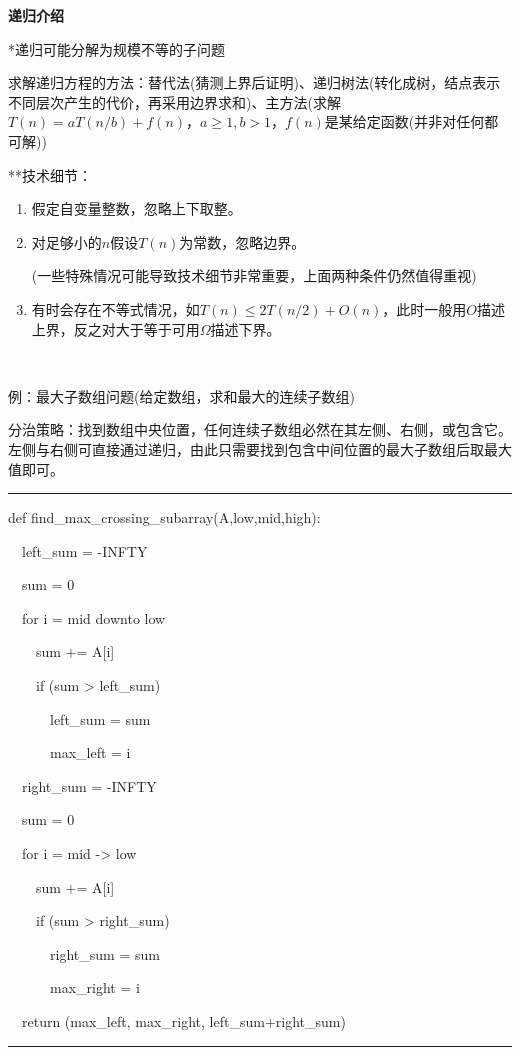 \documentclass[a4paper,UTF8,fontset=windows]{ctexart}
\newenvironment{code}{\rule{36em}{0.1em}\setlength{\parindent}{1em}

}{

\setlength{\parindent}{0em}\rule{36em}{0.1em}}
\begin{document}
\textbf{递归介绍}

*\hspace{0em}递归可能分解为规模不等的子问题

求解递归方程的方法：替代法(猜测上界后证明)、递归树法(转化成树，结点表示不同层次产生的代价，再采用边界求和)、主方法(求解$T(n)=aT(n/b)+f(n)$，$a\ge1,b>1$，$f(n)$是某给定函数(并非对任何都可解))

**\hspace{0em}技术细节：
\begin{enumerate}
    \item 假定自变量整数，忽略上下取整。
    \item 对足够小的$n$假设$T(n)$为常数，忽略边界。
        
        (一些特殊情况可能导致技术细节非常重要，上面两种条件仍然值得重视)

    \item 有时会存在不等式情况，如$T(n)\le2T(n/2)+O(n)$，此时一般用$O$描述上界，反之对大于等于可用$\Omega$描述下界。
\end{enumerate}

\

例：最大子数组问题(给定数组，求和最大的连续子数组)

分治策略：找到数组中央位置，任何连续子数组必然在其左侧、右侧，或包含它。左侧与右侧可直接通过递归，由此只需要找到包含中间位置的最大子数组后取最大值即可。

\begin{code}
def find\_max\_crossing\_subarray(A,low,mid,high):

\ \ left\_sum = -INFTY

\ \ sum = 0

\ \ for i = mid downto low

\ \ \ \ sum += A[i]

\ \ \ \ if (sum > left\_sum)

\ \ \ \ \ \ left\_sum = sum

\ \ \ \ \ \ max\_left = i

\ \ right\_sum = -INFTY

\ \ sum = 0

\ \ for i = mid -> low

\ \ \ \ sum += A[i]

\ \ \ \ if (sum > right\_sum)

\ \ \ \ \ \ right\_sum = sum

\ \ \ \ \ \ max\_right = i

\ \ return (max\_left, max\_right, left\_sum+right\_sum)

\end{code}
\end{document}

